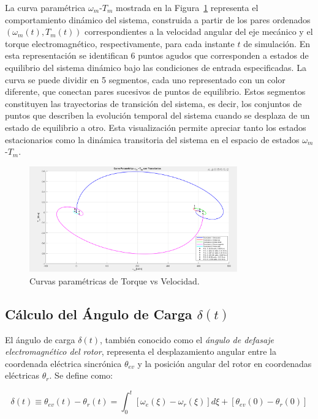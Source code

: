 \documentclass{article}
\begin{document}
\newpage
La curva paramétrica $\omega_m$-$T_m$ mostrada en la Figura~\ref{fig:CurvaParametricaTorquevsVelocidad} representa el comportamiento dinámico del sistema, construida a partir de los pares ordenados $(\omega_m(t),T_m(t))$ correspondientes a la velocidad angular del eje mecánico y el torque electromagnético, respectivamente, para cada instante $t$ de simulación. En esta representación se identifican 6 puntos agudos que corresponden a estados de equilibrio del sistema dinámico bajo las condiciones de entrada especificadas. La curva se puede dividir en 5 segmentos, cada uno representado con un color diferente, que conectan pares sucesivos de puntos de equilibrio. Estos segmentos constituyen las trayectorias de transición del sistema, es decir, los conjuntos de puntos que describen la evolución temporal del sistema cuando se desplaza de un estado de equilibrio a otro. Esta visualización permite apreciar tanto los estados estacionarios como la dinámica transitoria del sistema en el espacio de estados $\omega_m$-$T_m$.
\begin{figure}[H]
    \centering
    \includegraphics[width=0.8\textwidth]{Imagenes/CurvaParametricaWm-Tm.png}
    \caption{Curvas paramétricas de Torque vs Velocidad.}
    \label{fig:CurvaParametricaTorquevsVelocidad}
\end{figure}


\subsection*{Cálculo del Ángulo de Carga \(\delta(t)\)}

El ángulo de carga \(\delta(t)\), también conocido como el \textit{ángulo de defasaje electromagnético del rotor}, representa el desplazamiento angular entre la coordenada eléctrica sincrónica \(\theta_{ev}\) y la posición angular del rotor en coordenadas eléctricas \(\theta_r\). Se define como:

\begin{equation}
    \delta(t) \equiv \theta_{ev}(t) - \theta_r(t) = \int_0^t [\omega_e(\xi) - \omega_r(\xi)] d\xi + [\theta_{ev}(0) - \theta_r(0)]
\end{equation}
\end{document}
